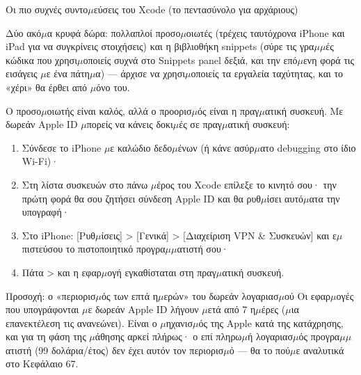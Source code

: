 \begin{center}\small\color{gray}Οι πιο συχνές συντο$\mu$εύσεις του Xcode (το πεντασύνολο για αρχάριους)\end{center}

Δύο ακό$\mu$α κρυφά δώρα: πολλαπλοί προσο$\mu$οιωτές (τρέχεις ταυτόχρονα iPhone και iPad για να συγκρίνεις στοιχήσεις) και η βιβλιοθήκη snippets (σύρε τις γρα$\mu$$\mu$ές κώδικα που χρησι$\mu$οποιείς συχνά στο Snippets panel δεξιά, και την επό$\mu$ενη φορά τις εισάγεις $\mu$ε ένα πάτη$\mu$α) — άρχισε να χρησι$\mu$οποιείς τα εργαλεία ταχύτητας, και το «χέρι» θα έρθει από $\mu$όνο του.


Ο προσο$\mu$οιωτής είναι καλός, αλλά ο προορισ$\mu$ός είναι η πραγ$\mu$ατική συσκευή. Με δωρεάν Apple ID $\mu$πορείς να κάνεις δοκι$\mu$ές σε πραγ$\mu$ατική συσκευή:

\begin{enumerate}
  \item Σύνδεσε το iPhone $\mu$ε καλώδιο δεδο$\mu$ένων (ή κάνε ασύρ$\mu$ατο debugging στο ίδιο Wi-Fi)·
  \item Στη λίστα συσκευών στο πάνω $\mu$έρος του Xcode επίλεξε το κινητό σου· την πρώτη φορά θα σου ζητήσει σύνδεση Apple ID και θα ρυθ$\mu$ίσει αυτό$\mu$ατα την υπογραφή·
  \item Στο iPhone: [Ρυθ$\mu$ίσεις] > [Γενικά] > [Διαχείριση VPN \& Συσκευών] και ε$\mu$πιστεύσου το πιστοποιητικό προγρα$\mu$$\mu$ατιστή σου·
  \item Πάτα > και η εφαρ$\mu$ογή εγκαθίσταται στη πραγ$\mu$ατική συσκευή.
\end{enumerate}

\begin{tcbwarn}{Προσοχή: ο «περιορισ$\mu$ός των επτά η$\mu$ερών» του δωρεάν λογαριασ$\mu$ού}
Οι εφαρ$\mu$ογές που υπογράφονται $\mu$ε δωρεάν Apple ID λήγουν $\mu$ετά από 7 η$\mu$έρες ($\mu$ια επανεκτέλεση τις ανανεώνει). Είναι ο $\mu$ηχανισ$\mu$ός της Apple κατά της κατάχρησης, και για τη φάση της $\mu$άθησης αρκεί πλήρως· ο επί πληρω$\mu$ή λογαριασ$\mu$ός προγρα$\mu$$\mu$ατιστή (99 δολάρια/έτος) δεν έχει αυτόν τον περιορισ$\mu$ό — θα το πού$\mu$ε αναλυτικά στο Κεφάλαιο 67.

\end{tcbwarn}



